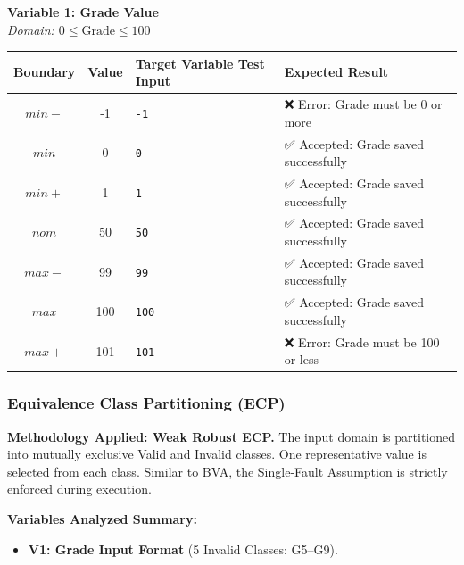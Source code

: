 \documentclass[twoside,final]{hcmut-report}
\begin{document}
\vspace{0.3cm}
\noindent\textbf{Variable 1: Grade Value} \\
\textit{Domain: $0 \le \text{Grade} \le 100$}
\begin{table}[H]
\centering
\renewcommand{\arraystretch}{1.2}
\begin{tabularx}{\textwidth}{|c|c|l|X|}
\hline
\textbf{Boundary} & \textbf{Value} & \textbf{Target Variable Test Input} & \textbf{Expected Result} \\ \hline
$min-$ & -1 & \texttt{-1} & ❌ Error: Grade must be 0 or more \\ \hline
$min$ & 0 & \texttt{0} & ✅ Accepted: Grade saved successfully \\ \hline
$min+$ & 1 & \texttt{1} & ✅ Accepted: Grade saved successfully \\ \hline
$nom$ & 50 & \texttt{50} & ✅ Accepted: Grade saved successfully \\ \hline
$max-$ & 99 & \texttt{99} & ✅ Accepted: Grade saved successfully \\ \hline
$max$ & 100 & \texttt{100} & ✅ Accepted: Grade saved successfully \\ \hline
$max+$ & 101 & \texttt{101} & ❌ Error: Grade must be 100 or less \\ \hline
\end{tabularx}
\end{table}

\subsubsection{Equivalence Class Partitioning (ECP)}
\textbf{Methodology Applied: Weak Robust ECP.}
The input domain is partitioned into mutually exclusive Valid and Invalid classes. One representative value is selected from each class. Similar to BVA, the Single-Fault Assumption is strictly enforced during execution.

\textbf{Variables Analyzed Summary:}
\begin{itemize}
    \item \textbf{V1: Grade Input Format} (5 Invalid Classes: G5–G9).
\end{itemize}
\end{document}
